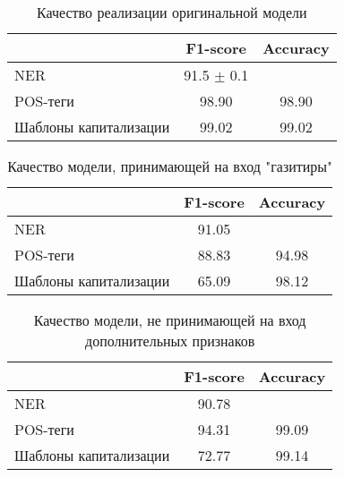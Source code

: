 \documentclass[a4paper,14pt]{extarticle}
\begin{document}
\begin{table}[H]
    \caption{Качество реализации оригинальной модели}
    \label{progress}
    \begin{center}
    \begin{tabular}{l|c|c}
                              & F1-score         & Accuracy \\
        \hline
        NER                   & 91.5 $\pm$ 0.1   &          \\
        POS-теги              & 98.90            & 98.90    \\
        Шаблоны капитализации & 99.02            & 99.02    \\
    \end{tabular}
    \end{center}
\end{table}

\begin{table}[H]
    \caption{Качество модели, принимающей на вход "газитиры"}
    \label{progress}
    \begin{center}
    \begin{tabular}{l|c|c}
                              & F1-score & Accuracy \\
        \hline
        NER                   & 91.05    &          \\
        POS-теги              & 88.83    & 94.98    \\
        Шаблоны капитализации & 65.09    & 98.12    \\
    \end{tabular}
    \end{center}
\end{table}

\begin{table}[H]
    \caption{Качество модели, не принимающей на вход дополнительных признаков}
    \label{progress}
    \begin{center}
    \begin{tabular}{l|c|c}
                              & F1-score & Accuracy \\
        \hline
        NER                   & 90.78    &          \\
        POS-теги              & 94.31    & 99.09    \\
        Шаблоны капитализации & 72.77    & 99.14    \\
    \end{tabular}
    \end{center}
\end{table}
\end{document}
